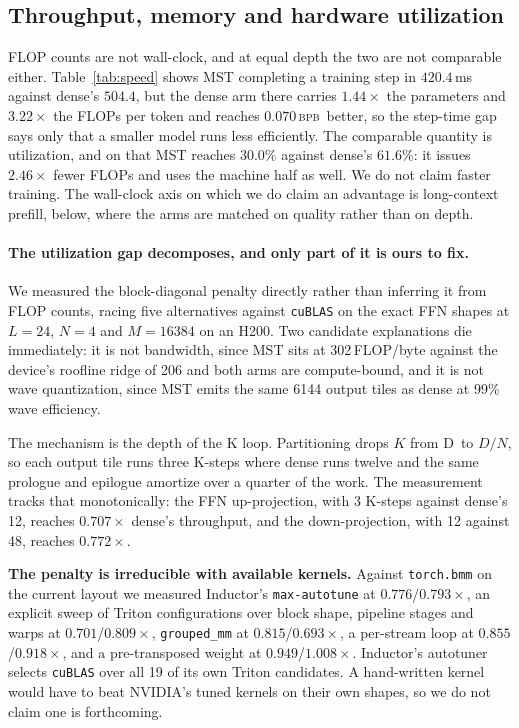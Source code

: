 \documentclass{article}
\newcommand{\bpb}{\textsc{bpb}}
\newcommand{\dmodel}{D}
\newcommand{\nsub}{N}
\begin{document}
\subsection{Throughput, memory and hardware utilization}

FLOP counts are not wall-clock, and at equal depth the two are not comparable
either. Table~\ref{tab:speed} shows MST completing a training step in $420.4$\,ms
against dense's $504.4$, but the dense arm there carries $1.44\times$ the
parameters and $3.22\times$ the FLOPs per token and reaches $0.070$\,\bpb\
better, so the step-time gap says only that a smaller model runs less
efficiently. The comparable quantity is utilization, and on that MST reaches
$30.0\%$ against dense's $61.6\%$: it issues $2.46\times$ fewer FLOPs and uses
the machine half as well. We do not claim faster training. The wall-clock axis on
which we do claim an advantage is long-context prefill, below, where the arms are
matched on quality rather than on depth.

\paragraph{The utilization gap decomposes, and only part of it is ours to fix.}
We measured the block-diagonal penalty directly rather than inferring it from
FLOP counts, racing five alternatives against \texttt{cuBLAS} on the exact FFN
shapes at $L{=}24$, $\nsub{=}4$ and $M{=}16384$ on an H200. Two candidate
explanations die immediately: it is not bandwidth, since MST sits at
302\,FLOP/byte against the device's roofline ridge of 206 and both arms are
compute-bound, and it is not wave quantization, since MST emits the same 6144
output tiles as dense at 99\% wave efficiency.

The mechanism is the depth of the K loop. Partitioning drops $K$ from \dmodel\ to
$\dmodel/\nsub$, so each output tile runs three K-steps where dense runs twelve
and the same prologue and epilogue amortize over a quarter of the work. The
measurement tracks that monotonically: the FFN up-projection, with 3 K-steps
against dense's 12, reaches $0.707\times$ dense's throughput, and the
down-projection, with 12 against 48, reaches $0.772\times$.

\textbf{The penalty is irreducible with available kernels.} Against
\texttt{torch.bmm} on the current layout we measured Inductor's
\texttt{max-autotune} at $0.776$/$0.793\times$, an explicit sweep of Triton
configurations over block shape, pipeline stages and warps at
$0.701$/$0.809\times$, \texttt{grouped\_mm} at $0.815$/$0.693\times$, a
per-stream loop at $0.855$/$0.918\times$, and a pre-transposed weight at
$0.949$/$1.008\times$. Inductor's autotuner selects \texttt{cuBLAS} over all 19
of its own Triton candidates. A hand-written kernel would have to beat NVIDIA's
tuned kernels on their own shapes, so we do not claim one is forthcoming.
\end{document}
